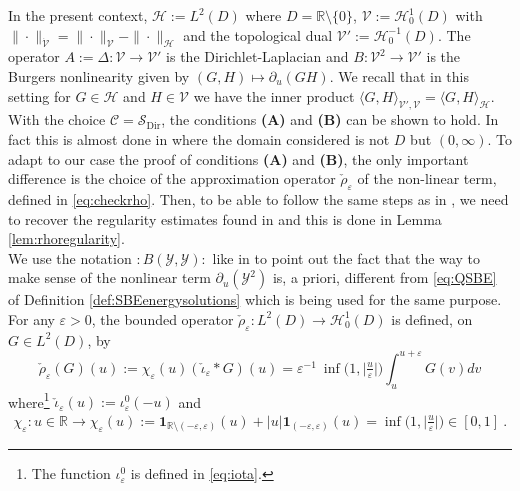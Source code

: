 \documentclass[a4paper, reqno, 12pt]{amsart}
\theoremstyle{plain}
\theoremstyle{definition}
\newcommand{\R}{\mathbb{R}}
\newcommand{\Sdir}{\mathcal{S}_{\text{Dir}}}
\begin{document}
In the present context, $\mathcal H:= L^2(D)$ where $D=\R\setminus \{0\}$, $\mathcal V := \mathcal H^1_0(D)$ with $\|\cdot\|_{\dot{\mathcal V}} = \|\cdot\|_{\mathcal V}-\|\cdot\|_{\mathcal H}$ and the topological dual $\mathcal V':= \mathcal H^{-1}_0(D)$. The operator $A := \Delta:\mathcal V\to \mathcal V'$ is the Dirichlet-Laplacian and $B:\mathcal V^2\to \mathcal V'$ is the Burgers nonlinearity given by $(G,H) \mapsto\partial_u (GH)$. 
We recall that in this setting for $G\in \mathcal H$ and $H\in\mathcal V$ we have the inner product $\langle G,H\rangle_{\mathcal V',\mathcal V} = \langle G , H\rangle_{\mathcal H}$. With the choice $\mathcal C=\Sdir$, the conditions  \textbf{(A)} and \textbf{(B)} can be shown to hold. In fact this is almost done in \cite[Example 4.1]{GPP24} where the domain considered is not $D$ but $(0,\infty)$. To adapt to our case the proof of conditions  \textbf{(A)} and \textbf{(B)}, the only important difference is the choice of the approximation operator $\check \rho_{\varepsilon}$ of the non-linear term, defined  in \eqref{eq:checkrho}. Then, to be able to follow the same steps as in \cite{GPP24}, we need to recover the regularity estimates found in \cite[Lemma A.4]{GPP24} and this is done in Lemma \ref{lem:rhoregularity}. \\


We use the notation $\colon B(\mathcal{Y},\mathcal{Y}) \colon $ like in \cite{GPP24} to point out the fact that the way to make sense of the nonlinear term $\partial_u (\mathcal Y^2)$  is, a priori, different from  \eqref{eq:QSBE} of Definition \ref{def:SBEenergysolutions} which is being used for the same purpose.\\



For any $\varepsilon>0$, the bounded operator $\check\rho_\varepsilon: L^2(D) \to \mathcal H^1_0(D)$ is defined, on  $G \in L^2 (D)$, by 
\begin{equation}
\label{eq:checkrho}
    \check\rho_\varepsilon(G)(u):= \chi_{\varepsilon} (u) (\check\iota_{\varepsilon} \ast G)(u)= \varepsilon^{-1} \ \inf \Big( 1, \big\vert \tfrac{u}{\varepsilon}\big\vert \Big) \int_u^{u+\varepsilon} G(v) dv
\end{equation}
where{\footnote{The function $\iota_\varepsilon^0$ is defined in \eqref{eq:iota}.}} $\check\iota_{\varepsilon}(u):=  \iota_{\varepsilon}^0(-u)$ and     
\begin{align}
\label{eq:defchiepxilon}
    \chi_{\varepsilon}: u \in \R\to \chi_{\varepsilon} (u):= {\mathbf 1}_{\R\setminus (-\varepsilon,\varepsilon)}(u) + |u|{\mathbf 1}_{(-\varepsilon,\varepsilon)}(u) = \inf \Big ( 1, \big\vert \tfrac{u}{\varepsilon} \big\vert \Big) \in [0,1] \ .
\end{align}
\end{document}
